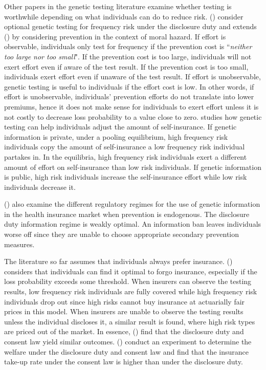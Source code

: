 \documentclass[natbib=false,preprint,12pt]{elsarticle}
\theoremstyle{plain}
\theoremstyle{definition}
\theoremstyle{plain}
\theoremstyle{TheoremNum}
\theoremstyle{CorollaryNum}
\theoremstyle{PropositionNum}
\theoremstyle{TheoremNum}
\begin{document}
Other papers in the genetic testing literature examine whether testing is worthwhile depending on what individuals can do to reduce risk. \citeauthor{bardey2013genetic} (\citeyear{bardey2013genetic}) consider optional genetic testing for frequency risk under the disclosure duty and extends \citeauthor{barigozzi2011genetic} (\citeyear{barigozzi2011genetic}) by considering prevention in the context of moral hazard. If effort is observable, individuals only test for frequency if the prevention cost is ``\textit{neither too large nor too small}". If the prevention cost is too large, individuals will not exert effort even if aware of the test result. If the prevention cost is too small, individuals exert effort even if unaware of the test result. If effort is unobservable, genetic testing is useful to individuals if the effort cost is low. In other words, if effort is unobservable, individuals' prevention efforts do not translate into lower premiums, hence it does not make sense for individuals to exert effort unless it is not costly to decrease loss probability to a value close to zero. \textcite{crainich2017self} studies how genetic testing can help individuals adjust the amount of self-insurance. If genetic information is private, under a pooling equilibrium, high frequency risk individuals copy the amount of self-insurance a low frequency risk individual partakes in. In the \textcite{rothschild1978equilibrium, miyazaki1977rat, spence1978product} equilibria, high frequency risk individuals exert a different amount of effort on self-insurance than low risk individuals. If genetic information is public, high risk individuals increase the self-insurance effort while low risk individuals decrease it.

\citeauthor*{peter2017endogenous} (\citeyear{peter2017endogenous}) also examine the different regulatory regimes for the use of genetic information in the health insurance market when prevention is endogenous. The disclosure duty information regime is weakly optimal. An information ban leaves individuals worse off since they are unable to choose appropriate secondary prevention measures. 

The literature so far assumes that individuals always prefer insurance. \citeauthor{posey2021genetic} (\citeyear{posey2021genetic}) considers that individuals can find it optimal to forgo insurance, especially if the loss probability exceeds some threshold. When insurers can observe the testing results, low frequency risk individuals are fully covered while high frequency risk individuals drop out since high risks cannot buy insurance at actuarially fair prices in this model. When insurers are unable to observe the testing results unless the individual discloses it, a similar result is found, where high risk types are priced out of the market. In essence, \citeauthor{posey2021genetic} (\citeyear{posey2021genetic}) find that the disclosure duty and consent law yield similar outcomes. \citeauthor*{bardey2019trade} (\citeyear{bardey2019trade}) conduct an experiment to determine the welfare under the disclosure duty and consent law and find that the insurance take-up rate under the consent law is higher than under the disclosure duty.
\end{document}
